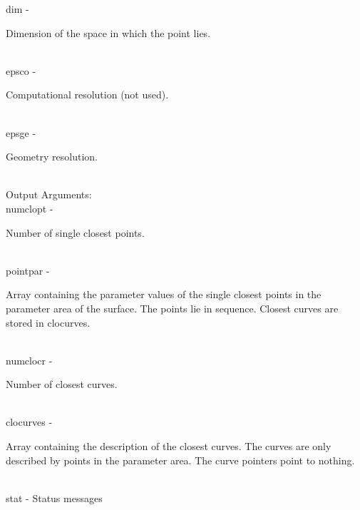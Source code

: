         \>\>    {\fov dim}\> - \>       \begin{minipg2}
                                Dimension of the space in which the point lies.
                                \end{minipg2}\\
        \>\>    {\fov epsco}\> - \>     \begin{minipg2}
                                Computational resolution (not used).
                                \end{minipg2}\\
        \>\>    {\fov epsge}\> - \>     \begin{minipg2}
                                Geometry resolution.
                                \end{minipg2}\\
        \>Output Arguments:\\
        \>\>    {\fov numclopt}\> - \>  \begin{minipg2}
                                Number of single closest points.
                                \end{minipg2}\\
        \>\>    {\fov pointpar}\> - \>  \begin{minipg2}
                                Array containing the parameter values of the
                                single closest points in the parameter area of
                                the surface. The points lie in sequence. Closest
                                curves are stored in clocurves.
                                \end{minipg2}\\[0.8ex]
        \>\>    {\fov numclocr}\> - \>  \begin{minipg2}
                                Number of closest curves.
                                \end{minipg2}\\
        \>\>    {\fov clocurves}\> - \> \begin{minipg2}
                                Array containing the description of the closest
                                curves. The curves are only described by points
                                in the parameter area. The curve pointers
                                point to nothing.
                                \end{minipg2}\\[0.3ex]
        \>\>    {\fov stat}     \> - \> Status messages\\

